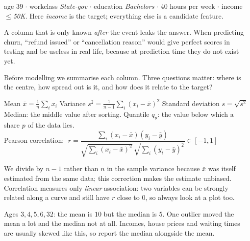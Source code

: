 \documentclass[11pt,a4paper]{article}
\begin{document}
\begin{bex}
age 39 $\cdot$ workclass \emph{State-gov} $\cdot$ education \emph{Bachelors} $\cdot$ 40 hours per week $\cdot$ income \emph{$\le$50K}. Here \emph{income} is the target; everything else is a candidate feature.
\end{bex}

\begin{bwarn}
A column that is only known \emph{after} the event leaks the answer. When predicting churn, ``refund issued'' or ``cancellation reason'' would give perfect scores in testing and be useless in real life, because at prediction time they do not exist yet.
\end{bwarn}

Before modelling we summarise each column. Three questions matter: where is the centre, how spread out is it, and how does it relate to the target?
\begin{bmath}
Mean $\bar x=\frac1n\sum_i x_i$ \qquad Variance $s^2=\frac{1}{n-1}\sum_i (x_i-\bar x)^2$ \qquad Standard deviation $s=\sqrt{s^2}$\\[3pt]
Median: the middle value after sorting. Quantile $q_p$: the value below which a share $p$ of the data lies.\\[3pt]
Pearson correlation: $\;r=\dfrac{\sum_i (x_i-\bar x)(y_i-\bar y)}{\sqrt{\sum_i (x_i-\bar x)^2}\,\sqrt{\sum_i (y_i-\bar y)^2}}\in[-1,1]$
\end{bmath}
We divide by $n-1$ rather than $n$ in the sample variance because $\bar x$ was itself estimated from the same data; this correction makes the estimate unbiased. Correlation measures only \emph{linear} association: two variables can be strongly related along a curve and still have $r$ close to 0, so always look at a plot too.

\begin{bex}
Ages $3,4,5,6,32$: the mean is $10$ but the median is $5$. One outlier moved the mean a lot and the median not at all. Incomes, house prices and waiting times are usually skewed like this, so report the median alongside the mean.
\end{bex}
\end{document}

